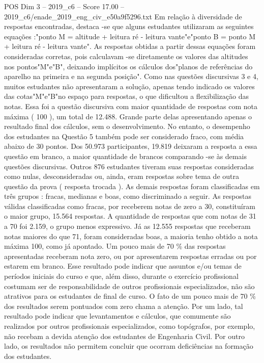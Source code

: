 \begin{textsample}{POS Dim 3 – 2019\_c6 – Score 17.00 – 2019\_c6/enade\_2019\_eng\_civ\_e50a9f5296.txt}
Em relação à diversidade de respostas encontradas, destaca -se que alguns estudantes utilizaram as seguintes equações :"ponto M = altitude + leitura ré - leitura vante"e"ponto B = ponto M + leitura ré - leitura vante".
As respostas obtidas a partir dessas equações foram consideradas corretas, pois calculavam -se diretamente os valores das altitudes nos pontos"M"e"B", deixando implícitos os cálculos dos"planos de referências do aparelho na primeira e na segunda posição".
Como nas questões discursivas 3 e 4, muitos estudantes não apresentaram a solução, apenas tendo indicado os valores das cotas"M"e"B"no espaço para respostas, o que dificultou a flexibilização das notas.
Essa foi a questão discursiva com maior quantidade de respostas com nota máxima ( 100 ), um total de 12.488.
Grande parte delas apresentando apenas o resultado final dos cálculos, sem o desenvolvimento.
No entanto, o desempenho dos estudantes na Questão 5 também pode ser considerado fraco, com média abaixo de 30 pontos.
Dos 50.973 participantes, 19.819 deixaram a resposta a essa questão em branco, a maior quantidade de brancos comparando -se às demais questões discursivas.
Outros 876 estudantes tiveram suas respostas consideradas como nulas, desconsideradas ou, ainda, eram respostas sobre tema de outra questão da prova ( resposta trocada ).
As demais respostas foram classificadas em três grupos : fracas, medianas e boas, como discriminado a seguir.
As respostas válidas classificadas como fracas, por receberem notas de zero a 30, constituíram o maior grupo, 15.564 respostas.
A quantidade de respostas que com notas de 31 a 70 foi 2.159, o grupo menos expressivo.
Já as 12.555 respostas que receberam notas maiores do que 71, foram consideradas boas, a maioria tenho obtido a nota máxima 100, como já apontado.
Um pouco mais de 70 \% das respostas apresentadas receberam nota zero, ou por apresentarem respostas erradas ou por estarem em branco.
Esse resultado pode indicar que assuntos e/ou temas de períodos iniciais do curso e que, além disso, durante o exercício profissional costumam ser de responsabilidade de outros profissionais especializados, não são atrativos para os estudantes de final de curso.
O fato de um pouco mais de 70 \% dos resultados serem pontuados com zero chama a atenção.
Por um lado, tal resultado pode indicar que levantamentos e cálculos, que comumente são realizados por outros profissionais especializados, como topógrafos, por exemplo, não recebam a devida atenção dos estudantes de Engenharia Civil.
Por outro lado, os resultados não permitem concluir que ocorram deficiências na formação dos estudantes.

\end{textsample}
